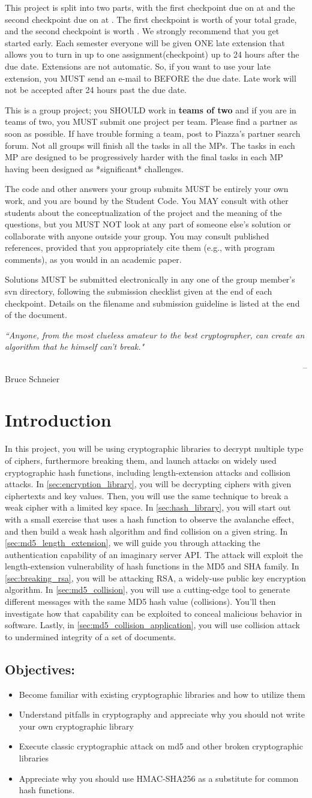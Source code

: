 \documentclass[letterpaper,12pt]{report}
\newcommand{\htitle}
{
     \noindent\parbox{\textwidth}
    {
        \course\hfill \distdate\newline
        \coursename\hfill 
        \settitle \vspace*{-.5ex}\newline
        \mbox{}\hrulefill\mbox{}
    }
    \vspace{8pt}
    \begin{center}{\Large\bf{\settitle}}\end{center}
}
\newcommand{\handout}
{
    \thispagestyle{empty}
    \markboth{}{}
    \pagestyle{plain}
    \htitle
}
\newcommand{\problemsetheader}
{
\setlength{\parindent}{0pt}


This project is split into two parts, with the first checkpoint due on {\bf \checkpointduedate} at {\bf \duetime} and the second checkpoint due on {\bf \duedate} at {\bf \duetime}. The first checkpoint is worth {\firstcheckpointpercent} of your total grade, and the second checkpoint is worth \secondcheckpointpercent.  We strongly recommend that you get started early. Each semester everyone will be given ONE late extension that allows you to turn in up to one assignment(checkpoint) up to 24 hours after the due date. Extensions are not automatic. So, if you want to use your late extension, you MUST send an e-mail to {\staffemail} BEFORE the due date. Late work will not be accepted after 24 hours past the due date. 
\medskip

This is a group project; you SHOULD work in \textbf{teams of two} and if you are in teams of two, you MUST submit one project per team.  Please find a partner as soon as possible.  If have trouble forming a team, post to Piazza's partner search forum. Not all groups will finish all the tasks in all
the MPs. The tasks in each MP are designed to be progressively harder with the final tasks in each
MP having been designed as *significant* challenges.

\medskip

The code and other answers your group submits MUST be entirely your own work, and you are bound by the Student Code.  You MAY consult with other students about the conceptualization of the project and the meaning of the questions, but you MUST NOT look at any part of someone else's solution or collaborate with anyone outside your group.  You may consult published references, provided that you appropriately cite them (e.g., with program comments), as you would in an academic paper.

\medskip

Solutions MUST be submitted electronically in any one of the group member's svn directory, following the submission checklist given at the end of each checkpoint. Details on the filename and submission guideline is listed at the end of the document.

\medskip

\hrulefill

\medskip

}
\begin{document}
\handout
\problemsetheader

\medskip
\noindent
\emph{``Anyone, from the most clueless amateur to the best cryptographer, can create an algorithm that he himself can't break."}

~~~~~~~~~~~~~~~~~~~~~~~~~~~~~~~~~~~~~~~~~~~~~~~~~~~~~~~~~~~~~~~~~~~~~~~-- Bruce Schneier 
\medskip
\pagebreak

\vspace{-6pt}
\section*{Introduction}
In this project, you will be using cryptographic libraries to decrypt multiple type of ciphers, furthermore breaking them, and launch attacks on widely used cryptographic hash functions, including length-extension attacks and collision attacks.  In \ref{sec:encryption_library}, you will be decrypting ciphers with given ciphertexts and key values.  Then, you will use the same technique to break a weak cipher with a limited key space.  In \ref{sec:hash_library}, you will start out with a small exercise that uses a hash function to observe the avalanche effect, and then build a weak hash algorithm and find collision on a given string. In \ref{sec:md5_length_extension}, we will guide you through attacking the authentication capability of an imaginary server API.  The attack will exploit the length-extension vulnerability of hash functions in the MD5 and SHA family.  In \ref{sec:breaking_rsa}, you will be attacking RSA, a widely-use public key encryption algorithm.  In \ref{sec:md5_collision}, you will use a cutting-edge tool to generate different messages with the same MD5 hash value (collisions).  You'll then investigate how that capability can be exploited to conceal malicious behavior in software. Lastly, in \ref{sec:md5_collision_application}, you will use collision attack to undermined integrity of a set of documents.

\subsection*{Objectives:}

\begin{itemize}
\item Become familiar with existing cryptographic libraries and how to utilize them
\item Understand pitfalls in cryptography and appreciate why you should not write your own cryptographic library
\item Execute classic cryptographic attack on md5 and other broken cryptographic libraries
\item Appreciate why you should use HMAC-SHA256 as a substitute for common hash functions.
\end{itemize}
\end{document}
